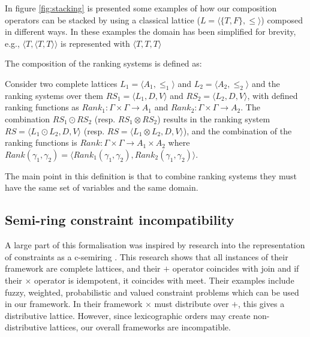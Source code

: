 In figure \ref{fig:stacking} is presented some examples of how our composition operators can be stacked
by using a classical lattice ($L = \langle \{T,F\}, \leq \rangle$) composed in different ways.
In these examples the domain has been simplified for brevity, 
e.g., $\langle T, \langle T,T\rangle\rangle$ is represented with $\langle T,T,T\rangle$

The composition of the ranking systems is defined as:
\begin{defs}
Consider two complete lattices $L_1 = \langle A_1, \leq_1 \rangle$ and $L_2 = \langle A_2,\leq_2 \rangle$ and
the ranking systems over them $RS_1 = \langle L_1,D,V \rangle $ and $RS_2 = \langle L_2,D,V \rangle$,
with defined ranking functions as $Rank_1: \Gamma \times \Gamma \rightarrow A_1 $ and $Rank_2: \Gamma \times \Gamma \rightarrow A_2$.
The combination $RS_1 \odot RS_2$ (resp. $RS_1 \otimes RS_2$) results in the ranking system 
$RS = \langle L_1 \odot L_2, D, V \rangle$ (resp. $RS = \langle L_1 \otimes L_2, D, V \rangle$), 
and the combination of the ranking functions is 
$Rank: \Gamma \times \Gamma \rightarrow A_1 \times A_2$ where $Rank(\gamma_1,\gamma_2) = \langle Rank_1(\gamma_1,\gamma_2), Rank_2(\gamma_1,\gamma_2) \rangle$.
\end{defs}

The main point in this definition is that to combine ranking systems they must have the same set of variables 
and the same domain.

\subsection{Semi-ring constraint incompatibility}
A large part of this formalisation was inspired by research into the representation of constraints as a c-semiring \cite{Bistarelli1997}.
This research shows that all instances of their framework are complete lattices, and their $+$ operator coincides with join
and if their $\times$ operator is idempotent, it coincides with meet.
Their examples include fuzzy, weighted, probabilistic and valued constraint problems which can be used in our framework.
In their framework $\times$ must distribute over $+$, this gives a distributive lattice.
However, since lexicographic orders may create non-distributive lattices, our overall frameworks are incompatible.


